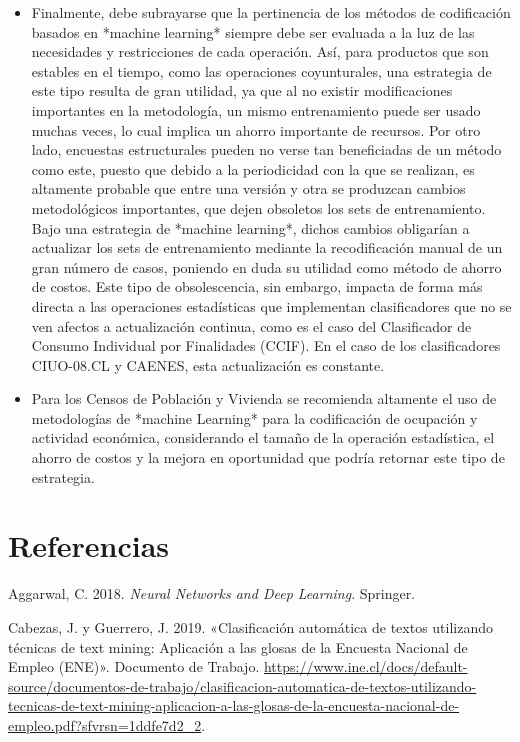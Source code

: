 \documentclass[
  12pt,
  spanish,
]{article}
\begin{document}
\begin{itemize}
  \item Finalmente, debe subrayarse que la pertinencia de los métodos de codificación basados en *machine learning* siempre debe ser evaluada a la luz de las necesidades y restricciones de cada operación. Así, para productos que son estables en el tiempo, como las operaciones coyunturales, una estrategia de este tipo resulta de gran utilidad, ya que al no existir modificaciones importantes en la metodología, un mismo entrenamiento puede ser usado muchas veces, lo cual implica un ahorro importante de recursos. Por otro lado, encuestas estructurales pueden no verse tan beneficiadas de un método como este, puesto que debido a la periodicidad con la que se realizan, es altamente probable que entre una versión y otra se produzcan cambios metodológicos importantes, que dejen obsoletos los sets de entrenamiento. Bajo una estrategia de *machine learning*,  dichos cambios obligarían a actualizar los sets de entrenamiento mediante la recodificación manual de un gran número de casos, poniendo en duda su utilidad como método de ahorro de costos. Este tipo de obsolescencia, sin embargo, impacta de forma más directa a las operaciones estadísticas que implementan clasificadores que no se ven afectos a actualización continua, como es el caso del Clasificador de Consumo Individual por Finalidades (CCIF). En el caso de los clasificadores CIUO-08.CL y CAENES, esta actualización es constante.

 \item Para los Censos de Población y Vivienda se recomienda altamente el uso de metodologías de *machine Learning* para la codificación de ocupación y actividad económica, considerando el tamaño de la operación estadística, el ahorro de costos y la mejora en oportunidad que podría retornar este tipo de estrategia.

\end{itemize}

\newpage

\hypertarget{referencias}{%
\section*{Referencias}\label{referencias}}

\hypertarget{refs}{}
\leavevmode\hypertarget{ref-aggarwal}{}%
Aggarwal, C. 2018. \emph{Neural Networks and Deep Learning}. Springer.

\leavevmode\hypertarget{ref-guerrero_cabezas}{}%
Cabezas, J. y Guerrero, J. 2019. «Clasificación automática de textos
utilizando técnicas de text mining: Aplicación a las glosas de la
Encuesta Nacional de Empleo (ENE)». Documento de Trabajo.
\url{https://www.ine.cl/docs/default-source/documentos-de-trabajo/clasificacion-automatica-de-textos-utilizando-tecnicas-de-text-mining-aplicacion-a-las-glosas-de-la-encuesta-nacional-de-empleo.pdf?sfvrsn=1ddfe7d2_2}.
\end{document}
